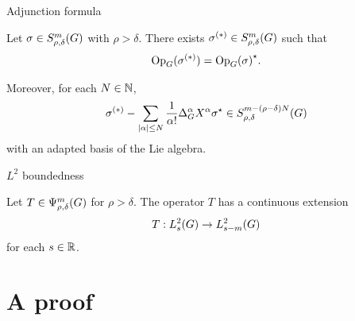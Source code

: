\documentclass{beamer}
\begin{document}
\begin{frame}{Adjunction formula}
    \begin{theorem}
        Let $\sigma \in S^{m}_{\rho, \delta}(G)$ with $\rho > \delta$.
        There exists $\sigma^{(*)} \in S^{m}_{\rho, \delta}(G)$ such that
        \begin{align*}
            \mathrm{Op}_{G}(\sigma^{(*)}) = {\mathrm{Op}_{G}(\sigma)}^\star.
        \end{align*}

        Moreover,
        for each $N \in \mathbb{N}$,
        \begin{align*}
            \sigma^{(*)} - \sum_{\abs \alpha \leq N} \frac 1 {\alpha!} \DifferenceOperatorOrder {\alpha} \LeftDifferentialOperator {\alpha} \adj \sigma \in \SymbolClass {m - (\rho - \delta) N} {\rho, \delta}
        \end{align*}
        with an adapted basis of the Lie algebra.
    \end{theorem}
\end{frame}

\begin{frame}{$L^2$ boundedness}
    \begin{theorem}[$L^2$ boundedness]
        Let $T \in \Psi^{m}_{\rho, \delta}(G)$ for $\rho > \delta$.
        The operator $T$ has a continuous extension
        \begin{align*}
            T : L^2_{s}(G) \to L^2_{s - m}(G)
        \end{align*}
        for each $s \in \mathbb{R}$.
    \end{theorem}
\end{frame}

\section{A proof}
\end{document}
